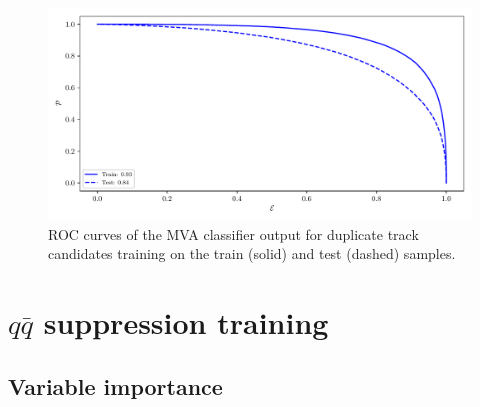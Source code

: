 \begin{figure}[H]
\centering
\captionsetup{width=0.8\linewidth}
\includegraphics[width=\linewidth]{fig/addendums/curl_roc}
\caption{ROC curves of the MVA classifier output for duplicate track candidates training on the train (solid) and test (dashed) samples.}
\end{figure}

\section*{$q \bar q$ suppression training}

\subsection*{Variable importance}

